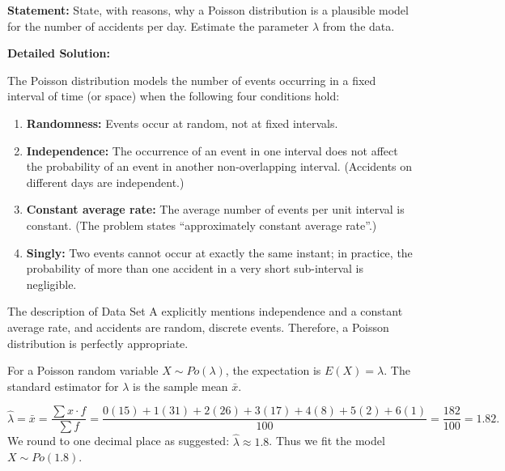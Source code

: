 \documentclass[11pt]{article}
\begin{document}
\begin{exoresolu}
\textbf{Statement:} State, with reasons, why a Poisson distribution is a plausible model for the number of accidents per day. Estimate the parameter $\lambda$ from the data.

\tcblower
\textbf{Detailed Solution:}

The Poisson distribution models the number of events occurring in a fixed interval of time (or space) when the following four conditions hold:
\begin{enumerate}
\item \textbf{Randomness:} Events occur at random, not at fixed intervals.
\item \textbf{Independence:} The occurrence of an event in one interval does not affect the probability of an event in another non-overlapping interval. (Accidents on different days are independent.)
\item \textbf{Constant average rate:} The average number of events per unit interval is constant. (The problem states ``approximately constant average rate''.)
\item \textbf{Singly:} Two events cannot occur at exactly the same instant; in practice, the probability of more than one accident in a very short sub-interval is negligible.
\end{enumerate}
The description of Data Set A explicitly mentions independence and a constant average rate, and accidents are random, discrete events. Therefore, a Poisson distribution is perfectly appropriate.

For a Poisson random variable $X \sim Po(\lambda)$, the expectation is $E(X) = \lambda$. The standard estimator for $\lambda$ is the sample mean $\bar{x}$.

\[
\hat{\lambda} = \bar{x} = \frac{\sum x \cdot f}{\sum f} = \frac{0(15) + 1(31) + 2(26) + 3(17) + 4(8) + 5(2) + 6(1)}{100} = \frac{182}{100} = 1.82.
\]
We round to one decimal place as suggested: $\hat{\lambda} \approx 1.8$. Thus we fit the model $X \sim Po(1.8)$.
\end{exoresolu}
\end{document}
